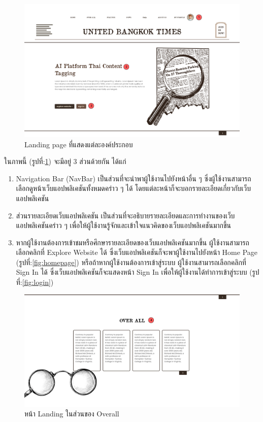 \documentclass[12pt,oneside,openright,a4paper]{cpe-thai-project}
\begin{document}
  \begin{figure}[!ht]\centering
    \includegraphics[width=15cm]{./img/project_ui/landing_page2.png} 
    \caption{Landing page ที่แสดงแต่ละองค์ประกอบ}\label{fig:landing_page_2} 
  \end{figure}
  \hspace*{1cm}ในภาพนี้ (รูปที่:\ref{fig:landing_page_2}) จะมีอยู่ 3 ส่วนด้วยกัน ได้แก่
  \begin{enumerate}
    \item Navigation Bar (NavBar) เป็นส่วนที่จะนำพาผู้ใช้งานไปยังหน้าอื่น ๆ 
          ซึ่งผู้ใช้งานสามารถเลือกดูหน้าเว็บแอปพลิเคชันทั้งหมดคร่าว ๆ ได้ โดยแต่ละหน้าก็จะบอกรายละเอียดเกี่ยวกับเว็บแอปพลิเคชัน
    \item ส่วนรายละเอียดเว็บแอปพลิเคชัน เป็นส่วนที่จะอธิบายรายละเอียดและการทำงานของเว็บแอปพลิเคชันคร่าว ๆ เพื่อให้ผู้ใช้งานรู้จักและเข้าใจแนวคิดของเว็บแอปพลิเคชันมากขึ้น
    \item หากผู้ใช้งานต้องการเข้าชมหรือศึกษารายละเอียดของเว็บแอปพลิเคชันมากขึ้น ผู้ใช้งานสามารถเลือกคลิกที่ Explore Website ได้ ซึ่งเว็บแอปพลิเคชันก็จะพาผู้ใช้งานไปยังหน้า Home Page (รูปที่:\ref{fig:homepage})
          หรือถ้าหากผู้ใช้งานต้องการเข้าสู่ระบบ ผู้ใช้งานสามารถเลือกคลิกที่ Sign In ได้ ซึ่งเว็บแอปพลิเคชันก็จะแสดงหน้า Sign In เพื่อให้ผู้ใช้งานได้ทำการเข้าสู่ระบบ (รูปที่:\ref{fig:login})
  \end{enumerate}
  \begin{figure}[!ht]\centering
    \includegraphics[width=14cm]{./img/project_ui/overall.png} 
    \caption{หน้า Landing ในส่วนของ Overall}\label{fig:overall} 
  \end{figure}
\end{document}
